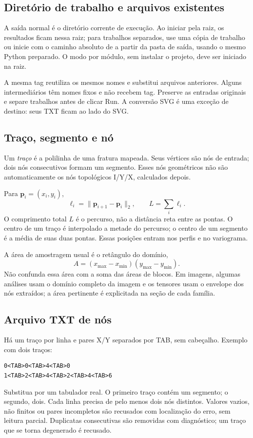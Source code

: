 \subsection{Diretório de trabalho e arquivos existentes}
A saída normal é o diretório corrente de execução. Ao iniciar pela raiz, os resultados ficam nessa raiz; para trabalhos separados, use uma cópia de trabalho ou inicie com o caminho absoluto de  a partir da pasta de saída, usando o mesmo Python preparado. O modo por módulo, sem instalar o projeto, deve ser iniciado na raiz.

A mesma tag reutiliza os mesmos nomes e substitui arquivos anteriores. Alguns intermediários têm nomes fixos e não recebem tag. Preserve as entradas originais e separe trabalhos antes de clicar Run. A conversão SVG é uma exceção de destino: seus TXT ficam ao lado do SVG.

\label{sec:dados}
\subsection{Traço, segmento e nó}
Um \emph{traço} é a polilinha de uma fratura mapeada. Seus vértices são nós de entrada; dois nós consecutivos formam um segmento. Esses nós geométricos não são automaticamente os nós topológicos I/Y/X, calculados depois.

Para \(\mathbf p_i=(x_i,y_i)\),
\begin{equation}
\ell_i=\|\mathbf p_{i+1}-\mathbf p_i\|_2,
\qquad L=\sum_i\ell_i.
\end{equation}
O comprimento total \(L\) é o percurso, não a distância reta entre as pontas. O centro de um traço é interpolado a metade do percurso; o centro de um segmento é a média de suas duas pontas. Essas posições entram nos perfis e no variograma.

A área de amostragem usual é o retângulo do domínio,
\begin{equation}
A=(x_{\max}-x_{\min})(y_{\max}-y_{\min}).
\end{equation}
Não confunda essa área com a soma das áreas de blocos. Em imagens, algumas análises usam o domínio completo da imagem e os tensores usam o envelope dos nós extraídos; a área pertinente é explicitada na seção de cada família.

\subsection{Arquivo TXT de nós}
Há um traço por linha e pares X/Y separados por TAB, sem cabeçalho. Exemplo com dois traços:
\begin{verbatim}
0<TAB>0<TAB>4<TAB>0
1<TAB>2<TAB>4<TAB>2<TAB>4<TAB>6
\end{verbatim}
Substitua  por um tabulador real. O primeiro traço contém um segmento; o segundo, dois. Cada linha precisa de pelo menos dois nós distintos. Valores vazios, não finitos ou pares incompletos são recusados com localização do erro, sem leitura parcial. Duplicatas consecutivas são removidas com diagnóstico; um traço que se torna degenerado é recusado.


